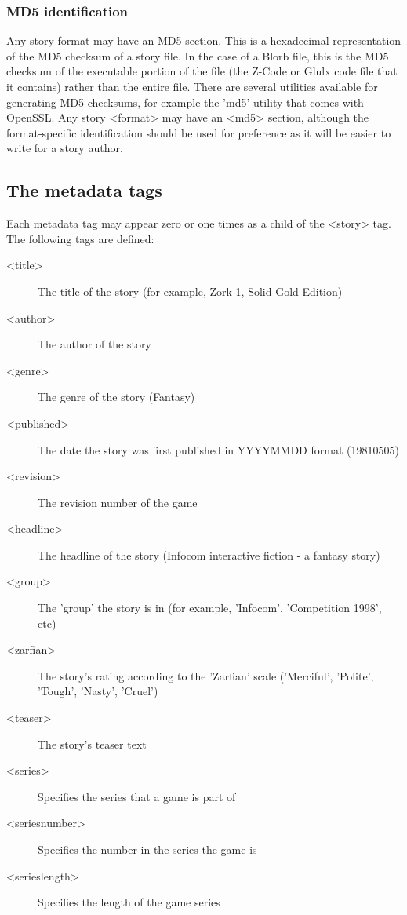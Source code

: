 \documentclass[a4paper,11pt]{article}
\begin{document}
\subsubsection{MD5 identification}

Any story format may have an MD5 section. This is a hexadecimal representation of the
MD5 checksum of a story file. In the case of a Blorb file, this is the MD5 checksum of
the executable portion of the file (the Z-Code or Glulx code file that it contains) rather
than the entire file. There are several utilities available for generating MD5 checksums,
for example the 'md5' utility that comes with OpenSSL. Any story <format> may have
an <md5> section, although the format-specific identification should be used for preference
as it will be easier to write for a story author.

\subsection{The metadata tags}

Each metadata tag may appear zero or one times as a child of  the <story> tag. The following
tags are defined:

\begin{description}
\item[<title>] The title of the story (for example, Zork 1, Solid Gold Edition)
\item[<author>] The author of the story
\item[<genre>] The genre of the story (Fantasy)
\item[<published>] The date the story was first published in YYYYMMDD format (19810505)
\item[<revision>] The revision number of the game
\item[<headline>] The headline of the story (Infocom interactive fiction - a fantasy story)
\item[<group>] The 'group' the story is in (for example, 'Infocom', 'Competition 1998', etc)
\item[<zarfian>] The story's rating according to the 'Zarfian' scale ('Merciful', 'Polite', 
'Tough', 'Nasty', 'Cruel')
\item[<teaser>] The story's teaser text
\item[<series>] Specifies the series that a game is part of
\item[<seriesnumber>] Specifies the number in the series the game is
\item[<serieslength>] Specifies the length of the game series
\end{description}
\end{document}
